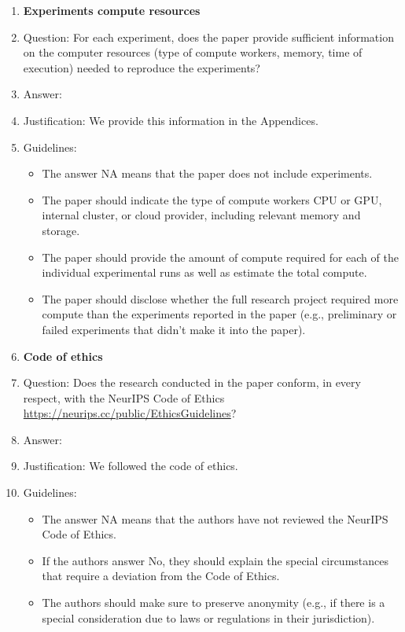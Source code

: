 \documentclass{article}
\begin{document}
\begin{enumerate}
\item {\bf Experiments compute resources}
    \item[] Question: For each experiment, does the paper provide sufficient information on the computer resources (type of compute workers, memory, time of execution) needed to reproduce the experiments?
    \item[] Answer: \answerYes{} %
    \item[] Justification: We provide this information in the Appendices.
    \item[] Guidelines:
    \begin{itemize}
        \item The answer NA means that the paper does not include experiments.
        \item The paper should indicate the type of compute workers CPU or GPU, internal cluster, or cloud provider, including relevant memory and storage.
        \item The paper should provide the amount of compute required for each of the individual experimental runs as well as estimate the total compute. 
        \item The paper should disclose whether the full research project required more compute than the experiments reported in the paper (e.g., preliminary or failed experiments that didn't make it into the paper). 
    \end{itemize}
    
\item {\bf Code of ethics}
    \item[] Question: Does the research conducted in the paper conform, in every respect, with the NeurIPS Code of Ethics \url{https://neurips.cc/public/EthicsGuidelines}?
    \item[] Answer: \answerYes{} %
    \item[] Justification: We followed the code of ethics.
    \item[] Guidelines:
    \begin{itemize}
        \item The answer NA means that the authors have not reviewed the NeurIPS Code of Ethics.
        \item If the authors answer No, they should explain the special circumstances that require a deviation from the Code of Ethics.
        \item The authors should make sure to preserve anonymity (e.g., if there is a special consideration due to laws or regulations in their jurisdiction).
    \end{itemize}



\end{enumerate}
\end{document}
